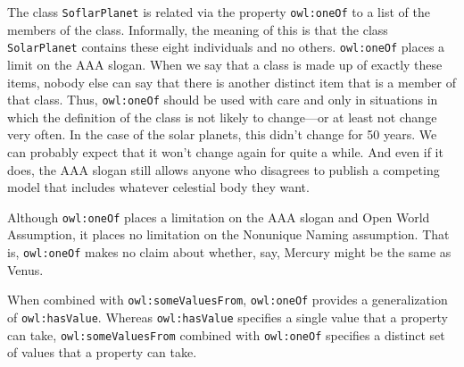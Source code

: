 The class \texttt{SoflarPlanet} is related via the property \texttt{owl:oneOf} to a list of
the members of the class. Informally, the meaning of this is that the
class \texttt{SolarPlanet} contains these eight individuals and no others.
\texttt{owl:oneOf} places a limit on the AAA slogan. When we say that a class is
made up of exactly these items, nobody else can say that there is
another distinct item that is a member of that class. Thus, \texttt{owl:oneOf}
should be used with care and only in situations in which the definition
of the class is not likely to change---or at least not change very
often. In the case of the solar planets, this didn't change for 50
years. We can probably expect that it won't change again for quite a
while.  And even if it does, the AAA slogan still allows anyone who disagrees to publish a competing model 
that includes whatever celestial body they want. 

Although \texttt{owl:oneOf} places a limitation on the AAA slogan and Open World
Assumption, it places no limitation on the Nonunique Naming assumption.
That is, \texttt{owl:oneOf} makes no claim about whether, say, Mercury might be
the same as Venus.

When combined with \texttt{owl:someValuesFrom}, \texttt{owl:oneOf} provides a
generalization of \texttt{owl:hasValue}. Whereas \texttt{owl:hasValue} specifies a single
value that a property can take, \texttt{owl:someValuesFrom} combined with
\texttt{owl:oneOf} specifies a distinct set of values that a property can take.

